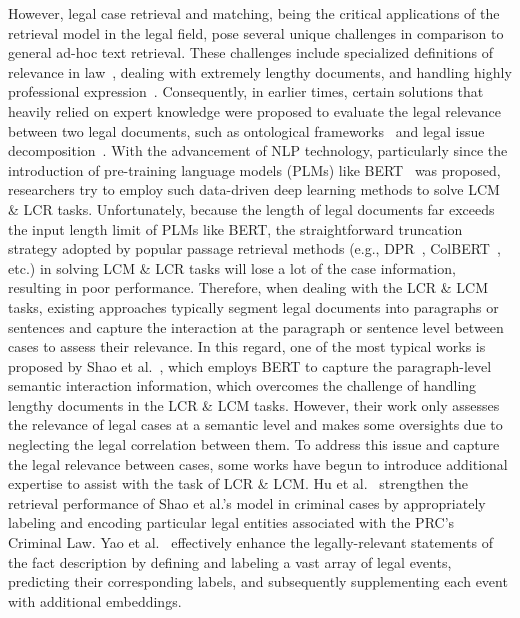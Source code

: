 However, legal case retrieval and matching, being the critical applications of the retrieval model in the legal field, pose several unique challenges in comparison to general ad-hoc text retrieval. These challenges include specialized definitions of relevance in law~\cite{van2017SpecialDefinition}, dealing with extremely lengthy documents, and handling highly professional expression~\cite{turtle1995Legalworld}.
Consequently, in earlier times, certain solutions that heavily relied on expert knowledge were proposed to evaluate the legal relevance between two legal documents, such as ontological frameworks~\cite{saravanan2009LCR_1} and legal issue decomposition~\cite{zeng2005LCR_2}.
With the advancement of NLP technology, particularly since the introduction of pre-training language models (PLMs) like BERT~\cite{devlin2018bert} was proposed, researchers try to employ such data-driven deep learning methods to solve LCM \& LCR tasks.
Unfortunately, because the length of legal documents far exceeds the input length limit of PLMs like BERT, the straightforward truncation strategy adopted by popular passage retrieval methods (e.g., DPR~\cite{karpukhin2020DPR}, ColBERT~\cite{khattab2020colbert}, etc.) in solving LCM \& LCR tasks will lose a lot of the case information, resulting in poor performance.
Therefore, when dealing with the LCR \& LCM tasks, existing approaches typically segment legal documents into paragraphs or sentences and capture the interaction at the paragraph or sentence level between cases to assess their relevance. 
In this regard, one of the most typical works is proposed by Shao et al.~\cite{shao2020Bert_PLI}, which employs BERT to capture the paragraph-level semantic interaction information, which overcomes the challenge of handling lengthy documents in the LCR \& LCM tasks.
However, their work only assesses the relevance of legal cases at a semantic level and makes some oversights due to neglecting the legal correlation between them.
To address this issue and capture the legal relevance between cases, some works have begun to introduce additional expertise to assist with the task of LCR \& LCM.
Hu et al.~\cite{hu2022Bert_LF} strengthen the retrieval performance of Shao et al.'s model in criminal cases by appropriately labeling and encoding particular legal entities associated with the PRC’s Criminal Law.
Yao et al.~\cite{yao2022LEVEN} effectively enhance the legally-relevant statements of the fact description by defining and labeling a vast array of legal events, predicting their corresponding labels, and subsequently supplementing each event with additional embeddings.
